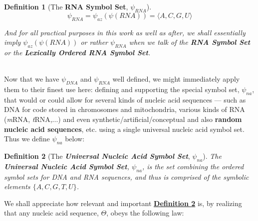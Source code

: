 \documentclass[a4paper, 18pt]{book} %
\newtheorem{defn}{Definition}
\newtheorem{law}{Law}
\begin{document}
{\begin{minipage}{0.9\textwidth}
\begin{defn}[The \textbf{RNA Symbol Set}, $\psi_{RNA}$]
\begin{equation}
\label{EQRNASS}
\psi_{RNA} = \psi_{az}(\psi(RNA)) = \langle A, C, G, U\rangle
\end{equation}

And for all practical purposes in this work as well as after, we shall essentially imply $\psi_{az}(\psi(RNA))$ or rather $\psi_{RNA}$ when we talk of the \textbf{RNA Symbol Set} or the \textbf{Lexically Ordered RNA Symbol Set}.

\end{defn}

\end{minipage}}
\\


Now that we have $\psi_{DNA}$ and $\psi_{RNA}$ well defined, we might immediately apply them to their finest use here: defining and supporting the special symbol set, $\psi_{na}$, that would or could allow for several kinds of nucleic acid sequences --- such as DNA for code stored in chromosomes and mitochondria, various kinds of RNA (\textit{m}RNA, \textit{t}RNA,...) and even synthetic/artificial/conceptual and also \textbf{random nucleic acid sequences}, etc. using a single universal nucleic acid symbol set. Thus we define $\psi_{na}$ below:


\begin{defn}[The \textit{\textbf{Universal Nucleic Acid Symbol Set}}, $\psi_{na}$]
\label{DEFUNA}
The \textbf{Universal Nucleic Acid Symbol Set}, $\psi_{na}$, is the set combining the ordered symbol sets for DNA and RNA sequences, and thus is comprised of the symbolic elements $\{A, C, G, T, U \}$.
\end{defn}


We shall appreciate how relevant and important \textbf{\hyperref[DEFUNA]{Definition \ref{DEFUNA}}} is, by realizing that any nucleic acid sequence, $\Theta$, obeys the following law:\\


\\\\
\end{document}
